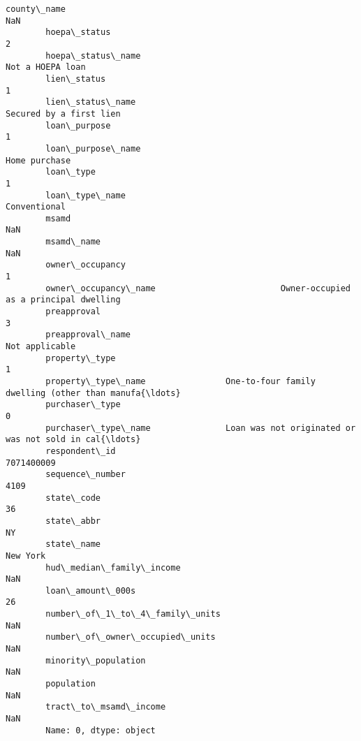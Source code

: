 \documentclass[11pt]{article}
\begin{document}
\begin{Verbatim}[commandchars=\\\{\}]
        county\_name                                                                     NaN
        hoepa\_status                                                                      2
        hoepa\_status\_name                                                  Not a HOEPA loan
        lien\_status                                                                       1
        lien\_status\_name                                            Secured by a first lien
        loan\_purpose                                                                      1
        loan\_purpose\_name                                                     Home purchase
        loan\_type                                                                         1
        loan\_type\_name                                                         Conventional
        msamd                                                                           NaN
        msamd\_name                                                                      NaN
        owner\_occupancy                                                                   1
        owner\_occupancy\_name                         Owner-occupied as a principal dwelling
        preapproval                                                                       3
        preapproval\_name                                                     Not applicable
        property\_type                                                                     1
        property\_type\_name                One-to-four family dwelling (other than manufa{\ldots}
        purchaser\_type                                                                    0
        purchaser\_type\_name               Loan was not originated or was not sold in cal{\ldots}
        respondent\_id                                                            7071400009
        sequence\_number                                                                4109
        state\_code                                                                       36
        state\_abbr                                                                       NY
        state\_name                                                                 New York
        hud\_median\_family\_income                                                        NaN
        loan\_amount\_000s                                                                 26
        number\_of\_1\_to\_4\_family\_units                                                   NaN
        number\_of\_owner\_occupied\_units                                                  NaN
        minority\_population                                                             NaN
        population                                                                      NaN
        tract\_to\_msamd\_income                                                           NaN
        Name: 0, dtype: object
\end{Verbatim}
            
\end{document}
